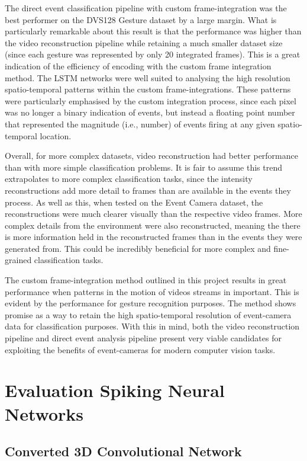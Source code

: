The direct event classification pipeline with custom frame-integration was the best performer on the DVS128 Gesture dataset by a large margin. What is particularly remarkable about this result is that the performance was higher than the video reconstruction pipeline while retaining a much smaller dataset size (since each gesture was represented by only 20 integrated frames). This is a great indication of the efficiency of encoding with the custom frame integration method. The LSTM networks were well suited to analysing the high resolution spatio-temporal patterns within the custom frame-integrations. These patterns were particularly emphasised by the custom integration process, since each pixel was no longer a binary indication of events, but instead a floating point number that represented the magnitude (i.e., number) of events firing at any given spatio-temporal location. 

Overall, for more complex datasets, video reconstruction had better performance than with more simple classification problems. It is fair to assume this trend extrapolates to more complex classification tasks, since the intensity reconstructions add more detail to frames than are available in the events they process. As well as this, when tested on the Event Camera dataset, the reconstructions were much clearer visually than the respective video frames. More complex details from the environment were also reconstructed, meaning the there is more information held in the reconstructed frames than in the events they were generated from. This could be incredibly beneficial for more complex and fine-grained classification tasks. 

The custom frame-integration method outlined in this project results in great performance when patterns in the motion of videos streams in important. This is evident by the performance for gesture recognition purposes. The method shows promise as a way to retain the high spatio-temporal resolution of event-camera data for classification purposes. With this in mind, both the video reconstruction pipeline and direct event analysis pipeline present very viable candidates for exploiting the benefits of event-cameras for modern computer vision tasks.

\section{Evaluation Spiking Neural Networks}

\subsection{Converted 3D Convolutional Network}

